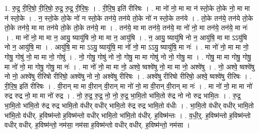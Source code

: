 \documentclass[17pt]{extarticle}
\begin{document}
1. रु॒द्र॒ री॒रि॒षो॒ री॒रि॒षो॒ रु॒द्र॒ रु॒द्र॒ री॒रि॒षः॒ । . री॒रि॒ष॒ इति॑ रीरिषः । . मा नो॑ नो॒ मा मा न॑ स्तो॒के तो॒के नो॒ मा मा न॑ स्तो॒के । . न॒ स्तो॒के तो॒के नो॑ न स्तो॒के तन॑ये॒ तन॑ये तो॒के नो॑ न स्तो॒के तन॑ये । . तो॒के तन॑ये॒ तन॑ये तो॒के तो॒के तन॑ये॒ मा मा तन॑ये तो॒के तो॒के तन॑ये॒ मा । . तन॑ये॒ मा मा तन॑ये॒ तन॑ये॒ मा नो॑ नो॒ मा तन॑ये॒ तन॑ये॒ मा नः॑ । . मा नो॑ नो॒ मा मा न॒ आयु॒ ष्यायु॑षि नो॒ मा मा न॒ आयु॑षि । . न॒ आयु॒ ष्यायु॑षि नो न॒ आयु॑षि॒ मा मा ऽऽयु॑षि नो न॒ आयु॑षि॒ मा । . आयु॑षि॒ मा मा ऽऽयु॒ ष्यायु॑षि॒ मा नो॑ नो॒ मा ऽऽयु॒ ष्यायु॑षि॒ मा नः॑ । . मा नो॑ नो॒ मा मा नो॒ गोषु॒ गोषु॑ नो॒ मा मा नो॒ गोषु॑ । . नो॒ गोषु॒ गोषु॑ नो नो॒ गोषु॒ मा मा गोषु॑ नो नो॒ गोषु॒ मा । . गोषु॒ मा मा गोषु॒ गोषु॒ मा नो॑ नो॒ मा गोषु॒ गोषु॒ मा नः॑ । . मा नो॑ नो॒ मा मा नो॒ अश्वे॒ ष्वश्वे॑षु नो॒ मा मा नो॒ अश्वे॑षु । . नो॒ अश्वे॒ ष्वश्वे॑षु नो नो॒ अश्वे॑षु रीरिषो रीरिषो॒ अश्वे॑षु नो नो॒ अश्वे॑षु रीरिषः । . अश्वे॑षु रीरिषो रीरिषो॒ अश्वे॒ ष्वश्वे॑षु रीरिषः । . री॒रि॒ष॒ इति॑ रीरिषः । . वी॒रान् मा मा वी॒रान् वी॒रान् मा नो॑ नो॒ मा वी॒रान् वी॒रान् मा नः॑ । . मा नो॑ नो॒ मा मा नो॑ रुद्र रुद्र नो॒ मा मा नो॑ रुद्र । . नो॒ रु॒द्र॒ रु॒द्र॒ नो॒ नो॒ रु॒द्र॒ भा॒मि॒तो भा॑मि॒तो रु॑द्र नो नो रुद्र भामि॒तः । . रु॒द्र॒ भा॒मि॒तो भा॑मि॒तो रु॑द्र रुद्र भामि॒तो व॑धीर् वधीर् भामि॒तो रु॑द्र रुद्र भामि॒तो व॑धीः । . भा॒मि॒तो व॑धीर् वधीर् भामि॒तो भा॑मि॒तो व॑धीर्. ह॒विष्म॑न्तो ह॒विष्म॑न्तो वधीर् भामि॒तो भा॑मि॒तो व॑धीर्. ह॒विष्म॑न्तः । . व॒धी॒र्॒. ह॒विष्म॑न्तो ह॒विष्म॑न्तो वधीर् वधीर्. ह॒विष्म॑न्तो॒ नम॑सा॒ नम॑सा ह॒विष्म॑न्तो वधीर् वधीर्. ह॒विष्म॑न्तो॒ नम॑सा । \newline
\end{document}
